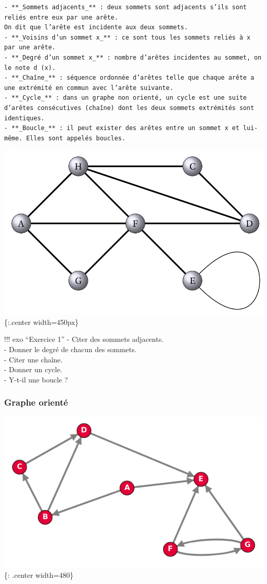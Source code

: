 \documentclass[
  letterpaper,
  DIV=11,
  numbers=noendperiod]{scrartcl}
\begin{document}
\begin{verbatim}
- **_Sommets adjacents_** : deux sommets sont adjacents s’ils sont reliés entre eux par une arête.  
On dit que l’arête est incidente aux deux sommets.  
- **_Voisins d’un sommet x_** : ce sont tous les sommets reliés à x par une arête.  
- **_Degré d’un sommet x_** : nombre d’arêtes incidentes au sommet, on le note d (x).  
- **_Chaîne_** : séquence ordonnée d’arêtes telle que chaque arête a une extrémité en commun avec l’arête suivante.  
- **_Cycle_** : dans un graphe non orienté, un cycle est une suite d’arêtes consécutives (chaîne) dont les deux sommets extrémités sont identiques.  
- **_Boucle_** : il peut exister des arêtes entre un sommet x et lui-même. Elles sont appelés boucles.  
\end{verbatim}

\includegraphics{data/graphe11.png}\{:.center width=450px\}

!!! exo ``Exercice 1'' - Citer des sommets adjacents.\\
- Donner le degré de chacun des sommets.\\
- Citer une chaîne.\\
- Donner un cycle.\\
- Y-t-il une boucle ?

\hypertarget{graphe-orientuxe9}{%
\subsubsection{Graphe orienté}\label{graphe-orientuxe9}}

\includegraphics{data/exemple_graphe_oriente.png}\{: .center width=480\}
\end{document}
